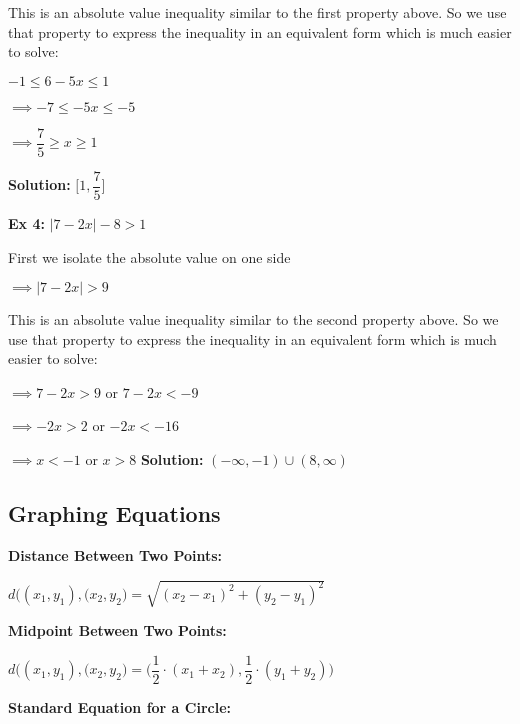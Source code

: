 \documentclass[12pt]{article}
\begin{document}
\begin{enumerate}
This is an absolute value inequality similar to the first property above. So we use that property to express the inequality in an equivalent form which is much easier to solve:

$-1 \leq 6 - 5x \leq 1$

$\implies -7 \leq - 5x \leq -5$

$\implies \dfrac{7}{5} \geq  x \geq 1$

\textbf{Solution:} $\Big[1, \dfrac{7}{5}\Big]$

\textbf{Ex 4:} $|7-2x| - 8 > 1$

First we isolate the absolute value on one side

$\implies |7-2x| > 9$

This is an absolute value inequality similar to the second property above. So we use that property to express the inequality in an equivalent form which is much easier to solve:

$\implies 7 - 2x > 9$ \hspace{1cm} or \hspace{1cm} $7-2x<-9$

$\implies - 2x > 2$ \hspace{1.4cm} or \hspace{1cm} $-2x<-16$

$\implies x < -1$ \hspace{1.6cm} or \hspace{1cm} $x>8$ \hspace{1cm} \textbf{Solution:} $(-\infty,-1) \cup (8,\infty)$

\end{enumerate}

\subsection{Graphing Equations}


\textbf{Distance Between Two Points:} 
\newline

\centerline{$d \Big((x_{1},y_{1}),(x_{2},y_{2}\Big) = \sqrt{(x_{2}-x_{1})^2+(y_{2}-y_{1})^2}$}

\textbf{Midpoint Between Two Points:} 
\newline

\centerline{$d \Big((x_{1},y_{1}),(x_{2},y_{2}\Big) =\Big(\dfrac{1}{2} \cdot (x_{1}+x_{2}), \dfrac{1}{2} \cdot (y_{1}+y_{2})\Big)$}

\textbf{Standard Equation for a Circle:} 
\newline
\end{document}
